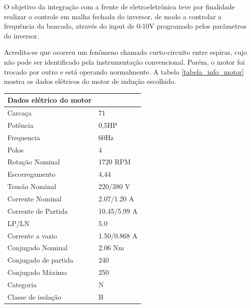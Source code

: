 O objetivo da integração com a frente de eletroeletrônica teve por finalidade realizar o controle em malha fechada do inversor, de modo a controlar a frequência da bancada, através do input de 0-10V programado pelos parâmetros do inversor.

Acredita-se que ocorreu um fenômeno chamado curto-circuito entre espiras, cujo não pode ser identificado pela instrumentação convencional. Porém, o motor foi trocado por outro e está operando normalmente. A tabela \ref{tabela_info_motor} mostra os dados elétricos do motor de indução escolhido.

        \begin{table}[h]
            \begin{center}
              \begin{tabular}{|p{5cm}|p{5cm}|}
                \hline
                \textbf{Dados elétrico do motor} &
                \\ \hline
                Carcaça & 71
                \\ \hline
                Potência & 0,5HP
                \\ \hline
                Frequencia & 60Hz
                \\ \hline
                Polos & 4
                \\ \hline
                Rotação Nominal & 1720 RPM
                \\ \hline
                Escorregamento & 4,44
                \\ \hline
                Tensão Nominal & 220/380 V
                \\ \hline
                Corrente Nominal & 2.07/1.20 A
                \\ \hline
                Corrente de Partida & 10.45/5.99 A
                \\ \hline
                LP/LN & 5.0
                \\ \hline
                Corrente a vazio & 1.50/0.868 A
                \\ \hline
                Conjugado Nominal & 2.06 Nm
                \\ \hline
                Conjugado de partida & 240
                \\ \hline
                Conjugado Máximo & 250
                \\ \hline
                Categoria & N
                \\ \hline
                Classe de isolação & B
                \\ \hline

\end{tabular}
\end{center}
\end{table}
